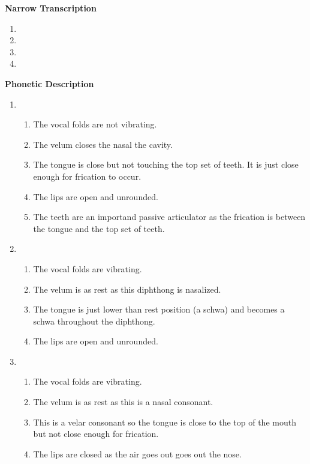 \documentclass[20pt]{article}
\newcommand{\ipa}[1]{\textipa{#1}}
\newcommand{\narrow}[1]{[ \ipa{#1} ]}
\newcommand{\sk}[0]{{\kern 0.05em}}
\begin{document}
\textbf{Narrow Transcription}
\begin{enumerate}
  \item \narrow{"k\super hwzaIk\ae T@R\textrhookschwa \sk \textltilde aIk}
  \item \narrow{n\~anzO"daI@k\textltilde i}
  \item \narrow{"S\sk \~{\t{3@}}nst\textltilde A\textdyoghlig z}
  \item \narrow{"t\~2Nkju\textltilde aID}
\end{enumerate} 

\textbf{Phonetic Description}

\begin{enumerate}
  \item \narrow{T}
    \begin{enumerate}
      \item The vocal folds are not vibrating.
      \item The velum closes the nasal the cavity.
      \item The tongue is close but not touching the top set of teeth. It is
        just close enough for frication to occur.
      \item The lips are open and unrounded.
      \item The teeth are an importand passive articulator as the frication is
        between the tongue and the top set of teeth.
    \end{enumerate}
  \item \narrow{\~{\t{3@}}}
    \begin{enumerate}
      \item The vocal folds are vibrating.
      \item The velum is as rest as this diphthong is nasalized.
      \item The tongue is just lower than rest position (a schwa) and becomes a
        schwa throughout the diphthong.
      \item The lips are open and unrounded.
    \end{enumerate}
  \item \narrow{N}
    \begin{enumerate}
      \item The vocal folds are vibrating.
      \item The velum is as rest as this is a nasal consonant.
      \item This is a velar consonant so the tongue is close to the top of the
        mouth but not close enough for frication.
      \item The lips are closed as the air goes out goes out the nose.

\end{enumerate}
\end{enumerate}
\end{document}
